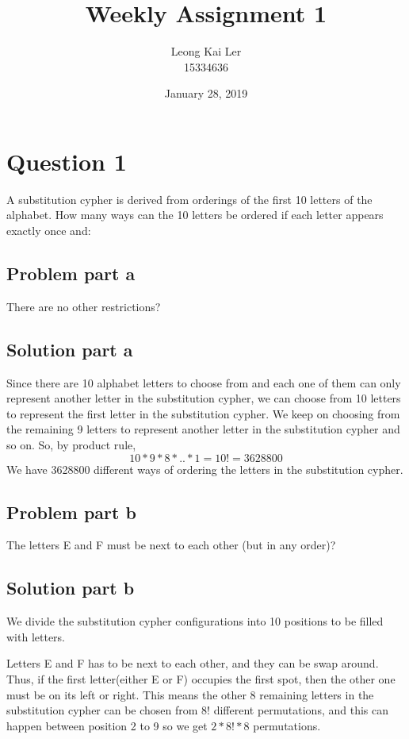 \documentclass[12pt]{article}%
\makeatletter
\renewcommand{\maketitle}{\bgroup\setlength{\parindent}{0pt}
\begin{flushleft}
  \textbf{\@title}

  \@author
  \@date
\end{flushleft}\egroup
}
\makeatother
\begin{document}
\title{Weekly Assignment 1}
\author{Leong Kai Ler \\ 15334636 \\   }
\date{January 28, 2019}
\maketitle

\section*{Question 1}
A substitution cypher is derived from orderings of the first 10 letters of the alphabet. How many ways can the 10 letters be ordered if each letter appears exactly once and:
 
\subsection*{Problem part a}
There are no other restrictions?

\subsection*{Solution part a}
Since there are 10 alphabet letters to choose from and each one of them can only represent another letter in the substitution cypher, we can choose from 10 letters to represent the first letter in the substitution cypher. We keep on choosing from the remaining 9 letters to represent another letter in the substitution cypher and so on. So, by product rule,
\begin{equation} 
 10 * 9 * 8 * .. * 1 = 10! = 3628800 
\end{equation}
 We have 3628800 different ways of ordering the letters in the substitution cypher. 
 
\subsection*{Problem part b}
The letters E and F must be next to each other (but in any order)?
\subsection*{Solution part b}
We divide the substitution cypher configurations into 10 positions to be filled with letters.

Letters E and F has to be next to each other, and they can be swap around. Thus, if the first letter(either E or F) occupies the first spot, then the other one must be on its left or right. This means the other 8 remaining letters in the substitution cypher can be chosen from 8! different permutations, and this can happen between position 2 to 9 so we get \begin{math}2 * 8! * 8 \end{math} permutations. \\
\end{document}
